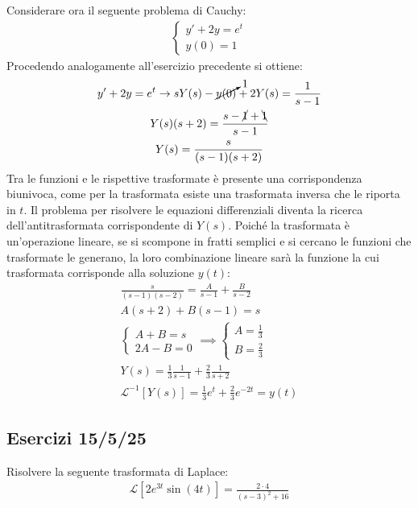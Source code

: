\documentclass{article}
\numberwithin{equation}{subsection}
\begin{document}
Considerare ora il seguente problema di Cauchy:
\begin{gather*}
    \begin{cases}
        y'+2y=e^t\\
        y(0)=1
    \end{cases}
\end{gather*}
Procedendo analogamente all'esercizio precedente si ottiene:
\begin{gather*}
    y'+2y=e^t\to sY(s)-\cancelto{1}{y(0)}+2Y(s)=\frac{1}{s-1}\\
    Y(s)(s+2)=\frac{s-\cancel{1}+\bcancel{1}}{s-1}\\
    Y(s)=\frac{s}{(s-1)(s+2)}
\end{gather*}
Tra le funzioni e le rispettive trasformate è presente una corrispondenza biunivoca, come per la trasformata esiste una trasformata inversa che le riporta in $t$. Il problema per risolvere le equazioni differenziali diventa la ricerca dell'antitrasformata corrispondente di $Y(s)$. Poiché la trasformata è un'operazione lineare, se si scompone in fratti semplici e si cercano le funzioni che trasformate le generano, la loro combinazione lineare sarà la funzione la cui trasformata corrisponde alla soluzione $y(t)$:
\begin{gather*}
    \frac{s}{(s-1)(s-2)}=\frac{A}{s-1}+\frac{B}{s-2}\\
    A(s+2)+B(s-1)=s\\
    \begin{cases}
        A+B=s\\
        2A-B=0
    \end{cases}\implies\begin{cases}
        A=\frac{1}{3}\\
        B=\frac{2}{3}
    \end{cases}\\
    Y(s)=\frac{1}{3}\frac{1}{s-1}+\frac{2}{3}\frac{1}{s+2}\\
    \mathscr{L}^{-1}[Y(s)]=\frac{1}{3}e^{t}+\frac{2}{3}e^{-2t}=y(t)
\end{gather*}

\subsection*{Esercizi 15/5/25}

Risolvere la seguente trasformata di Laplace:
\begin{gather*}
    \mathscr{L}[2e^{3t}\sin(4t)]=\frac{2\cdot4}{(s-3)^2+16}
\end{gather*}
\end{document}
